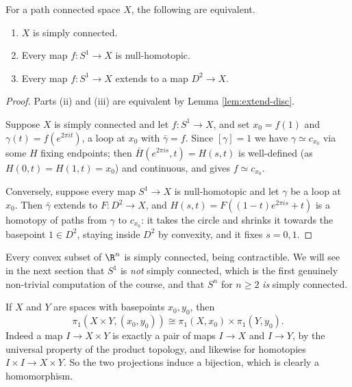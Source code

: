 \begin{proposition} \label{prop:sc-equiv}
	For a path connected space $X$, the following are equivalent.
	\begin{enumerate}
		\item $X$ is simply connected.
		\item Every map $f: S^1 \to X$ is null-homotopic.
		\item Every map $f: S^1 \to X$ extends to a map $D^2 \to X$.
	\end{enumerate}
\end{proposition}
\begin{proof}
	Parts (ii) and (iii) are equivalent by Lemma \ref{lem:extend-disc}.

	Suppose $X$ is simply connected and let $f: S^1 \to X$, and set $x_0 = f(1)$ and $\gamma(t) = f(e^{2\pi i t})$, a loop at $x_0$ with $\bar\gamma = f$. Since $[\gamma] = 1$ we have $\gamma \simeq c_{x_0}$ via some $H$ fixing endpoints; then $\bar H(e^{2\pi i s}, t) = H(s,t)$ is well-defined (as $H(0,t) = H(1,t) = x_0$) and continuous, and gives $f \simeq c_{x_0}$.

	Conversely, suppose every map $S^1 \to X$ is null-homotopic and let $\gamma$ be a loop at $x_0$. Then $\bar\gamma$ extends to $F: D^2 \to X$, and $H(s,t) = F((1-t)e^{2\pi i s} + t)$ is a homotopy of paths from $\gamma$ to $c_{x_0}$: it takes the circle and shrinks it towards the basepoint $1 \in D^2$, staying inside $D^2$ by convexity, and it fixes $s = 0, 1$.
\end{proof}

\begin{example}
	Every convex subset of $\R^n$ is simply connected, being contractible. We will see in the next section that $S^1$ is \emph{not} simply connected, which is the first genuinely non-trivial computation of the course, and that $S^n$ for $n \geq 2$ \emph{is} simply connected.
\end{example}

\begin{example} \label{ex:pi1-product}
	If $X$ and $Y$ are spaces with basepoints $x_0, y_0$, then
	$$
	\pi_1(X \times Y, (x_0,y_0)) \cong \pi_1(X,x_0) \times \pi_1(Y,y_0).
	$$
	Indeed a map $I \to X \times Y$ is exactly a pair of maps $I \to X$ and $I \to Y$, by the universal property of the product topology, and likewise for homotopies $I \times I \to X\times Y$. So the two projections induce a bijection, which is clearly a homomorphism.
\end{example}

